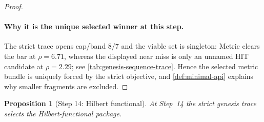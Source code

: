 \documentclass[11pt,a4paper]{article}
\theoremstyle{plain}
\newtheorem{proposition}[theorem]{Proposition}
\theoremstyle{definition}
\theoremstyle{remark}
\begin{document}
\begin{proof}
\paragraph{Why it is the unique selected winner at this step.}
The strict trace opens cap/band $8/7$ and the viable set is singleton:
Metric clears the bar at $\rho=6.71$, whereas the displayed near miss is only an
unnamed HIT candidate at $\rho=2.29$; see
\cref{tab:genesis-sequence-trace}.
Hence the selected metric bundle is uniquely forced by the strict objective, and
\cref{def:minimal-api} explains why smaller fragments are excluded.
\end{proof}

\begin{proposition}[Step 14: Hilbert functional]
\label{prop:genesis-step14}
At Step~14 the strict genesis trace selects the Hilbert-functional package.
\end{proposition}
\end{document}
